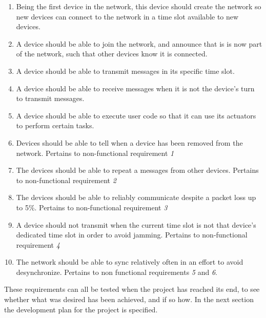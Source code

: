 \begin{enumerate}[label=\itshape \alph*\upshape)]
    \item Being the first device in the network, this device should create the network so new devices can connect to the network in a time slot available to new devices.
    \item A device should be able to join the network, and announce that is is now part of the network, such that other devices know it is connected.
    \item A device should be able to transmit messages in its specific time slot.
    \item A device should be able to receive messages when it is not the device's turn to transmit messages.
    \item A device should be able to execute user code so that it can use its actuators to perform certain tasks.
    \item Devices should be able to tell when a device has been removed from the network. Pertains to non-functional requirement \textit{1}
    \item The devices should be able to repeat a messages from other devices. Pertains to non-functional requirement \textit{2}
    \item The devices should be able to reliably communicate despite a packet loss up to 5\%. Pertains to non-functional requirement \textit{3}
    \item A device should not transmit when the current time slot is not that device's dedicated time slot in order to avoid jamming. Pertains to non-functional requirement \textit{4}
    \item The network should be able to sync relatively often in an effort to avoid desynchronize. Pertains to non functional requirements \textit{5} and \textit{6}.
\end{enumerate}
\noindent
These requirements can all be tested when the project has reached its end, to see whether what was desired has been achieved, and if so how. 
In the next section the development plan for the project is specified.

